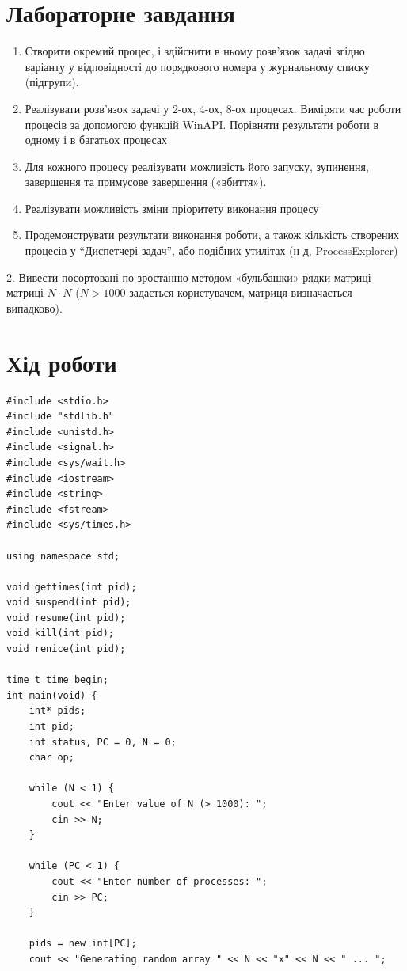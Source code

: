 \documentclass{article}
\begin{document}
\begin{normalsize}
	\section*{Лабораторне завдання}
	\begin{enumerate}
		\item Створити окремий процес, і здійснити в ньому розв’язок задачі
		згідно варіанту у відповідності до порядкового номера у
		журнальному списку (підгрупи).
		\item Реалізувати розв’язок задачі у 2-ох, 4-ох, 8-ох процесах. Виміряти
		час роботи процесів за допомогою функцій WinAPI. Порівняти
		результати роботи в одному і в багатьох процесах
		\item Для кожного процесу реалізувати можливість його запуску,
		зупинення, завершення та примусове завершення («вбиття»).
		\item Реалізувати можливість зміни пріоритету виконання процесу
		\item Продемонструвати результати виконання роботи, а також кількість
		створених процесів у “Диспетчері задач”, або подібних утилітах (н-д,
		ProcessExplorer)
	\end{enumerate}
	\begin{center}
		2. Вивести посортовані по зростанню методом «бульбашки» рядки
		матриці матриці $N\cdot N$ ($N>1000$ задається користувачем, матриця
		визначається випадково).
	\end{center}

	\section*{Хід роботи}	
	\begin{lstlisting}                 
#include <stdio.h>
#include "stdlib.h"
#include <unistd.h>
#include <signal.h>
#include <sys/wait.h>
#include <iostream>
#include <string>
#include <fstream>
#include <sys/times.h>

using namespace std;

void gettimes(int pid);
void suspend(int pid);
void resume(int pid);
void kill(int pid);
void renice(int pid);

time_t time_begin;
int main(void) {
	int* pids;
	int pid;
	int status, PC = 0, N = 0;
	char op;
	
	while (N < 1) {
		cout << "Enter value of N (> 1000): ";
		cin >> N;
	}
	
	while (PC < 1) {
		cout << "Enter number of processes: ";
		cin >> PC;
	}
	
	pids = new int[PC];
	cout << "Generating random array " << N << "x" << N << " ... ";
	

\end{lstlisting}
\end{normalsize}
\end{document}
